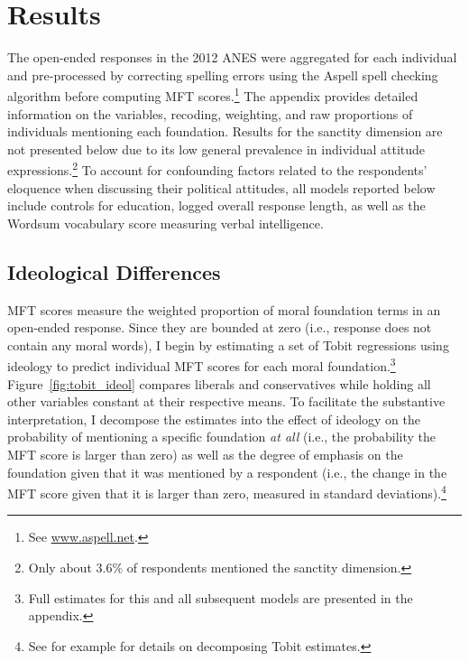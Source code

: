 \documentclass[12pt]{article}
\begin{document}
\section*{Results}

The open-ended responses in the 2012 ANES were aggregated for each individual and pre-processed by correcting spelling errors using the Aspell spell checking algorithm before computing MFT scores.\footnote{See \url{www.aspell.net}.} The appendix provides detailed information on the variables, recoding, weighting, and raw proportions of individuals mentioning each foundation. Results for the sanctity dimension are not presented below due to its low general prevalence in individual attitude expressions.\footnote{Only about 3.6\% of respondents mentioned the sanctity dimension.} To account for confounding factors related to the respondents' eloquence when discussing their political attitudes, all models reported below include controls for education, logged overall response length, as well as the Wordsum vocabulary score measuring verbal intelligence.




\subsection*{Ideological Differences}

MFT scores measure the weighted proportion of moral foundation terms in an open-ended response. Since they are bounded at zero (i.e., response does not contain any moral words), I begin by estimating a set of Tobit regressions using ideology to predict individual MFT scores for each moral foundation.\footnote{Full estimates for this and all subsequent models are presented in the appendix.} Figure~\ref{fig:tobit_ideol} compares liberals and conservatives while holding all other variables constant at their respective means. To facilitate the substantive interpretation, I decompose the estimates into the effect of ideology on the probability of mentioning a specific foundation \textit{at all} (i.e., the probability the MFT score is larger than zero) as well as the degree of emphasis on the foundation given that it was mentioned by a respondent (i.e., the change in the MFT score given that it is larger than zero, measured in standard deviations).\footnote{See for example \citet{mcdonald1980uses} for details on decomposing Tobit estimates.}
\end{document}
